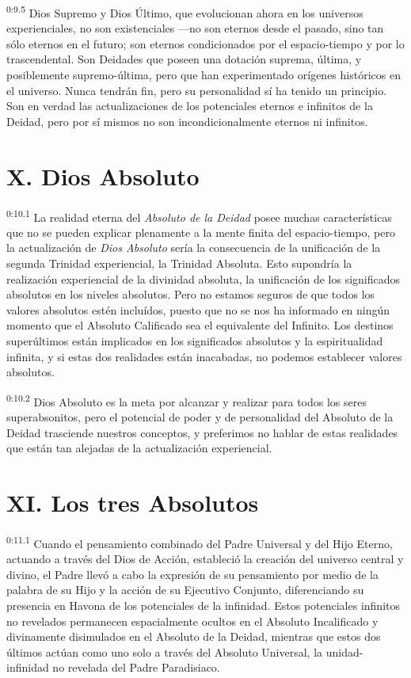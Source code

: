 \par
\textsuperscript{0:9.5} Dios Supremo y Dios Último, que evolucionan ahora en los universos experienciales, no son existenciales ---no son eternos desde el pasado, sino tan sólo eternos en el futuro; son eternos condicionados por el espacio-tiempo y por lo trascendental. Son Deidades que poseen una dotación suprema, última, y posiblemente supremo-última, pero que han experimentado orígenes históricos en el universo. Nunca tendrán fin, pero su personalidad sí ha tenido un principio. Son en verdad las actualizaciones de los potenciales eternos e infinitos de la Deidad, pero por sí mismos no son incondicionalmente eternos ni infinitos.

\section*{X. Dios Absoluto}
\par
\textsuperscript{0:10.1} La realidad eterna del \textit{Absoluto de la Deidad} posee muchas características que no se pueden explicar plenamente a la mente finita del espacio-tiempo, pero la actualización de \textit{Dios Absoluto} sería la consecuencia de la unificación de la segunda Trinidad experiencial, la Trinidad Absoluta. Esto supondría la realización experiencial de la divinidad absoluta, la unificación de los significados absolutos en los niveles absolutos. Pero no estamos seguros de que todos los valores absolutos estén incluídos, puesto que no se nos ha informado en ningún momento que el Absoluto Calificado sea el equivalente del Infinito. Los destinos superúltimos están implicados en los significados absolutos y la espiritualidad infinita, y si estas dos realidades están inacabadas, no podemos establecer valores absolutos.

\par
\textsuperscript{0:10.2} Dios Absoluto es la meta por alcanzar y realizar para todos los seres superabsonitos, pero el potencial de poder y de personalidad del Absoluto de la Deidad trasciende nuestros conceptos, y preferimos no hablar de estas realidades que están tan alejadas de la actualización experiencial.

\section*{XI. Los tres Absolutos}
\par
\textsuperscript{0:11.1} Cuando el pensamiento combinado del Padre Universal y del Hijo Eterno, actuando a través del Dios de Acción, estableció la creación del universo central y divino, el Padre llevó a cabo la expresión de su pensamiento por medio de la palabra de su Hijo y la acción de su Ejecutivo Conjunto, diferenciando su presencia en Havona de los potenciales de la infinidad. Estos potenciales infinitos no revelados permanecen espacialmente ocultos en el Absoluto Incalificado y divinamente disimulados en el Absoluto de la Deidad, mientras que estos dos últimos actúan como uno solo a través del Absoluto Universal, la unidad-infinidad no revelada del Padre Paradisiaco.

